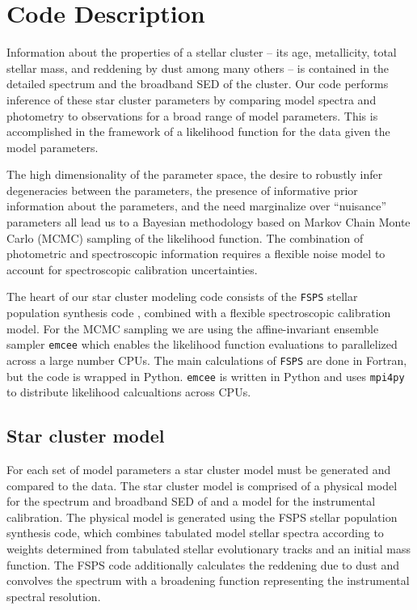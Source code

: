 \section{Code Description}

Information about the properties of a stellar cluster -- its age,
metallicity, total stellar mass, and reddening by dust among many
others -- is contained in the detailed spectrum and the broadband SED
of the cluster. Our code performs inference of these star cluster
parameters by comparing model spectra and photometry to observations
for a broad range of model parameters.  This is accomplished in the
framework of a likelihood function for the data given the model
parameters.  

The high dimensionality of the parameter space, the desire to robustly
infer degeneracies between the parameters, the presence of informative
prior information about the parameters, and the need marginalize over
``nuisance'' parameters all lead us to a Bayesian methodology based on
Markov Chain Monte Carlo (MCMC) sampling of the likelihood
function. The combination of photometric and spectroscopic information
requires a flexible noise model to account for spectroscopic
calibration uncertainties.

The heart of our star cluster modeling code consists of the
\texttt{FSPS} stellar population synthesis code \citep{fsps}, combined
with a flexible spectroscopic calibration model.  For the MCMC
sampling we are using the affine-invariant ensemble sampler
\texttt{emcee} \citep{emcee} which enables the likelihood function
evaluations to parallelized across a large number CPUs. The main
calculations of \texttt{FSPS} are done in Fortran, but the code is
wrapped in Python.  \texttt{emcee} is written in Python and uses
\texttt{mpi4py} to distribute likelihood calcualtions across CPUs.

\subsection{Star cluster model}
For each set of model parameters a star cluster model must be
generated and compared to the data. The star cluster model is
comprised of a physical model for the spectrum and broadband SED of
and a model for the instrumental calibration.  The physical model is
generated using the FSPS stellar population synthesis code, which
combines tabulated model stellar spectra according to weights
determined from tabulated stellar evolutionary tracks and an initial
mass function.  The FSPS code additionally calculates the reddening
due to dust and convolves the spectrum with a broadening function
representing the instrumental spectral resolution.

